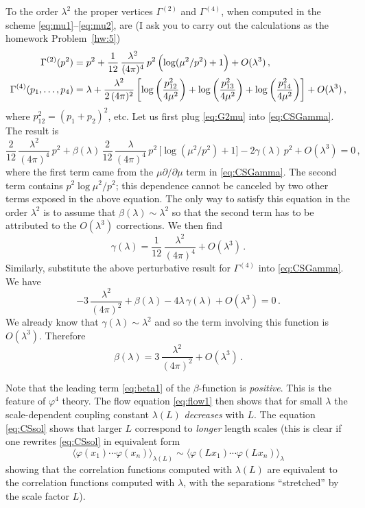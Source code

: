 To the order $\lambda^2$ the proper vertices $\Gamma^{(2)}$ and $\Gamma^{(4)}$,
when computed in the scheme \eqref{eq:mu1}--\eqref{eq:mu2}, are (I ask you to
carry out the calculations as the homework Problem~\ref{hw:5})
\begin{align}
\Gamma^{(2)}(p^2)&=p^2+\frac1{12}\,\frac{\lambda^2}{(4\pi)^4}\,p^2\,\Bigl(\log(\mu^2/p^2)+1\Bigr)+O(\lambda^3)\,,\label{eq:G2mu}\\
\Gamma^{(4)}(p_1,\dots,p_4)&=\lambda+\frac{\lambda^2}{2\,(4\pi)^2}\left[\log\left(\frac{p_{12}^2}{4\mu^2}\right)+\log\left(\frac{p_{13}^2}{4\mu^2}\right)+\log\left(\frac{p_{14}^2}{4\mu^2}\right)\right]+O(\lambda^3)\,,\label{eq:G4mu}
\end{align}
where $p_{12}^2=(p_1+p_2)^2$, etc. Let us first plug \eqref{eq:G2mu} into
\eqref{eq:CSGamma}. The result is
\[
\frac2{12}\,\frac{\lambda^2}{(4\pi)^4}\,p^2+\beta(\lambda)\,\frac2{12}\,\frac\lambda{(4\pi)^4}\,p^2\,\bigl[\log(\mu^2/p^2)+1\bigr]-2\gamma(\lambda)\,p^2+O(\lambda^3)=0\,,
\]
where the first term came from the $\mu\partial/\partial\mu$ term in
\eqref{eq:CSGamma}. The second term contains $p^2\log\mu^2/p^2$; this dependence
cannot be canceled by two other terms exposed in the above equation. The only way
to satisfy this equation in the order $\lambda^2$ is to assume that
$\beta(\lambda)\sim\lambda^2$ so that the second term has to be attributed to the
$O(\lambda^3)$ corrections. We then find
\begin{equation}\label{eq:gamma1}
\gamma(\lambda)=\frac1{12}\,\frac{\lambda^2}{(4\pi)^4}+O(\lambda^3)\,.
\end{equation}
Similarly, substitute the above perturbative result for $\Gamma^{(4)}$ into
\eqref{eq:CSGamma}. We have
\[
-3\,\frac{\lambda^2}{(4\pi)^2}+\beta(\lambda)-4\lambda\,\gamma(\lambda)+O(\lambda^3)=0\,.
\]
We already know that $\gamma(\lambda)\sim\lambda^2$ and so the term involving this
function is $O(\lambda^3)$. Therefore
\begin{equation}\label{eq:beta1}
\beta(\lambda)=3\,\frac{\lambda^2}{(4\pi)^2}+O(\lambda^3)\,.
\end{equation}

Note that the leading term \eqref{eq:beta1} of the $\beta$-function is
\emph{positive}. This is the feature of $\varphi^4$ theory. The flow equation
\eqref{eq:flow1} then shows that for small $\lambda$ the scale-dependent coupling
constant $\lambda(L)$ \emph{decreases} with $L$. The equation \eqref{eq:CSsol}
shows that larger $L$ correspond to \emph{longer} length scales (this is clear if
one rewrites \eqref{eq:CSsol} in equivalent form
\[
\bigl\langle\varphi(x_1)\cdots\varphi(x_n)\bigr\rangle_{\lambda(L)}\sim\bigl\langle\varphi(Lx_1)\cdots\varphi(Lx_n)\bigr\rangle_\lambda
\]
showing that the correlation functions computed with $\lambda(L)$ are equivalent
to the correlation functions computed with $\lambda$, with the separations
``stretched'' by the scale factor $L$).

